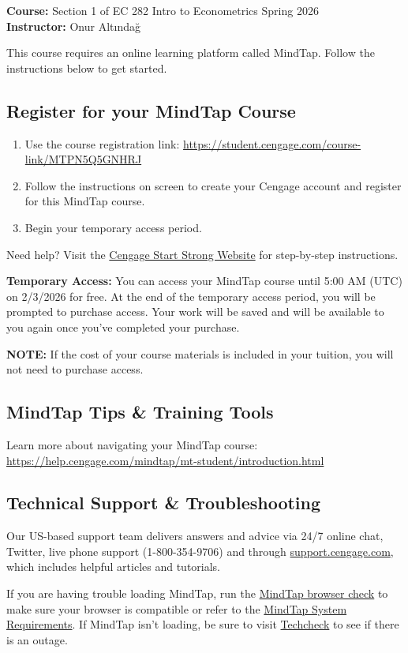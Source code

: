 \documentclass[11pt,letterpaper]{article}
\begin{document}
\textbf{Course:} Section 1 of EC 282 Intro to Econometrics Spring 2026\\
\textbf{Instructor:} Onur Altındağ

This course requires an online learning platform called MindTap. Follow the instructions below to get started.

\subsection*{Register for your MindTap Course}
\begin{enumerate}
    \item Use the course registration link: \url{https://student.cengage.com/course-link/MTPN5Q5GNHRJ}
    \item Follow the instructions on screen to create your Cengage account and register for this MindTap course.
    \item Begin your temporary access period.
\end{enumerate}

Need help? Visit the \href{https://startstrong.cengage.com}{Cengage Start Strong Website} for step-by-step instructions.

\textbf{Temporary Access:} You can access your MindTap course until 5:00 AM (UTC) on 2/3/2026 for free. At the end of the temporary access period, you will be prompted to purchase access. Your work will be saved and will be available to you again once you've completed your purchase.

\textbf{NOTE:} If the cost of your course materials is included in your tuition, you will not need to purchase access.

\subsection*{MindTap Tips \& Training Tools}
Learn more about navigating your MindTap course: \url{https://help.cengage.com/mindtap/mt-student/introduction.html}

\subsection*{Technical Support \& Troubleshooting}
Our US-based support team delivers answers and advice via 24/7 online chat, Twitter, live phone support (1-800-354-9706) and through \href{https://support.cengage.com}{support.cengage.com}, which includes helpful articles and tutorials.

If you are having trouble loading MindTap, run the \href{https://ng.cengage.com/static/browsercheck/index.html}{MindTap browser check} to make sure your browser is compatible or refer to the \href{https://help.cengage.com/mindtap/MindTap-System-Requirements.pdf}{MindTap System Requirements}. If MindTap isn't loading, be sure to visit \href{https://techcheck.cengage.com}{Techcheck} to see if there is an outage.
\end{document}
